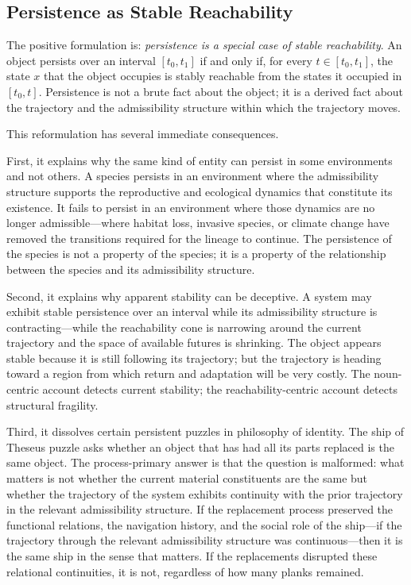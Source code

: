 \documentclass[12pt, a4paper]{article}
\theoremstyle{plain}
\theoremstyle{definition}
\theoremstyle{remark}
\begin{document}
\subsection{Persistence as Stable Reachability}

The positive formulation is: \emph{persistence is a special case of stable
reachability}. An object persists over an interval $[t_0, t_1]$ if and only
if, for every $t \in [t_0, t_1]$, the state $x$ that the object occupies
is stably reachable from the states it occupied in $[t_0, t]$. Persistence
is not a brute fact about the object; it is a derived fact about the
trajectory and the admissibility structure within which the trajectory moves.

This reformulation has several immediate consequences.

First, it explains why the same kind of entity can persist in some
environments and not others. A species persists in an environment where
the admissibility structure supports the reproductive and ecological dynamics
that constitute its existence. It fails to persist in an environment where
those dynamics are no longer admissible---where habitat loss, invasive
species, or climate change have removed the transitions required for the
lineage to continue. The persistence of the species is not a property of
the species; it is a property of the relationship between the species and
its admissibility structure.

Second, it explains why apparent stability can be deceptive. A system may
exhibit stable persistence over an interval while its admissibility structure
is contracting---while the reachability cone is narrowing around the current
trajectory and the space of available futures is shrinking. The object
appears stable because it is still following its trajectory; but the
trajectory is heading toward a region from which return and adaptation will
be very costly. The noun-centric account detects current stability; the
reachability-centric account detects structural fragility.

Third, it dissolves certain persistent puzzles in philosophy of identity.
The ship of Theseus puzzle asks whether an object that has had all its
parts replaced is the same object. The process-primary answer is that the
question is malformed: what matters is not whether the current material
constituents are the same but whether the trajectory of the system exhibits
continuity with the prior trajectory in the relevant admissibility structure.
If the replacement process preserved the functional relations, the navigation
history, and the social role of the ship---if the trajectory through the
relevant admissibility structure was continuous---then it is the same ship
in the sense that matters. If the replacements disrupted these relational
continuities, it is not, regardless of how many planks remained.
\end{document}

